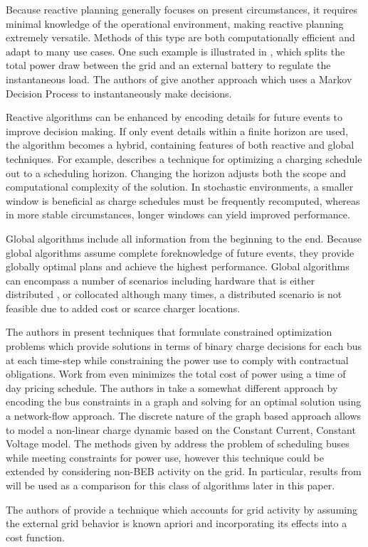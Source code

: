 \par Because reactive planning generally focuses on present circumstances, it requires minimal knowledge of the operational environment, making reactive planning extremely versatile.  Methods of this type are both computationally efficient and adapt to many use cases.  One such example is illustrated in \cite{cheng_smart_2020}, which splits the total power draw between the grid and an external battery to regulate the instantaneous load. The authors of \cite{Wang2019} give another approach which uses a Markov Decision Process to instantaneously make decisions.
\par Reactive algorithms can be enhanced by encoding details for future events to improve decision making. If only event details within a finite horizon are used, the algorithm becomes a hybrid, containing features of both reactive and global techniques. For example, \cite{bagherinezhad_spatio-temporal_2020} describes a technique for optimizing a charging schedule out to a scheduling horizon. Changing the horizon adjusts both the scope and computational complexity of the solution. In stochastic environments, a smaller window is beneficial as charge schedules must be frequently recomputed, whereas in more stable circumstances, longer windows can yield improved performance. 
\par Global algorithms include all information from the beginning to the end. Because global algorithms assume complete foreknowledge of future events, they provide globally optimal plans and achieve the highest performance. Global algorithms can encompass a number of scenarios including hardware that is either distributed \cite{Nimalsiri2020}, or collocated although many times, a distributed scenario is not feasible due to added cost or scarce charger locations.
\par The authors in \cite{el-taweel_incorporation_2019, Leou_optimal_2017, Wei2018, Rinalde_Mixed_2020, He_2019_Fast} present techniques that formulate constrained optimization problems which provide solutions in terms of binary charge decisions for each bus at each time-step while constraining the power use to comply with contractual obligations. Work from \cite{Zhou_2020_Collaborative} even minimizes the total cost of power using a time of day pricing schedule. The authors in \cite{whitaker_network_2021} take a somewhat different approach by encoding the bus constraints in a graph and solving for an optimal solution using a network-flow approach. The discrete nature of the graph based approach allows \cite{whitaker_network_2021} to model a non-linear charge dynamic based on the Constant Current, Constant Voltage model. The methods given by \cite{el-taweel_incorporation_2019, Leou_optimal_2017, whitaker_network_2021, He_2022_Battery} address the problem of scheduling buses while meeting constraints for power use, however this technique could be extended by considering non-BEB activity on the grid. In particular, results from \cite{He_2022_Battery} will be used as a comparison for this class of algorithms later in this paper.
\par The authors of \cite{jahic_preemptive_2019} provide a technique which accounts for grid activity by assuming the external grid behavior is known apriori and incorporating its effects into a cost function.
